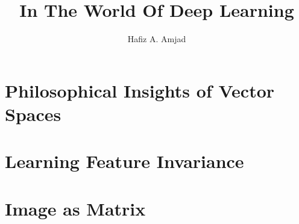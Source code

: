 \documentclass[grad]{ontariotechu-thesis}
\author{Hafiz A. Amjad}
\title{In The World Of Deep Learning}
\begin{document}
\begin{preliminary}

\maketitle








\tableofcontents


\listoftables


\listoffigures


\end{preliminary}
\chapter{Philosophical Insights of Vector Spaces}

\chapter{Learning Feature Invariance}

\chapter{Image as Matrix}

\end{document}
